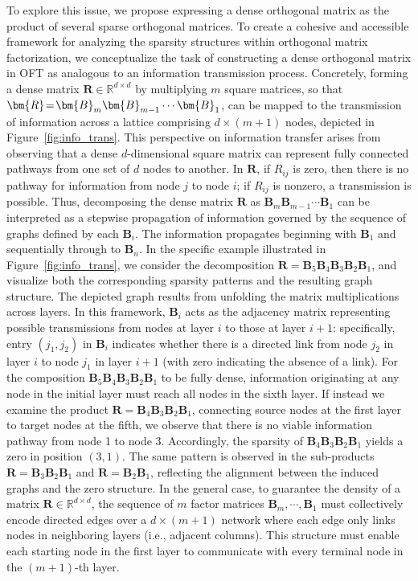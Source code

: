 To explore this issue, we propose expressing a dense orthogonal matrix as the product of several sparse orthogonal matrices. To create a cohesive and accessible framework for analyzing the sparsity structures within orthogonal matrix factorization, we conceptualize the task of constructing a dense orthogonal matrix in OFT as analogous to an information transmission process. Concretely, forming a dense matrix $\bm{R}\in\mathbb{R}^{d\times d}$ by multiplying $m$ square matrices, so that $\thickmuskip=2mu \medmuskip=2mu \bm{R}=\bm{B}_m\bm{B}_{m-1}\cdots\bm{B}_1$, can be mapped to the transmission of information across a lattice comprising $d\times (m+1)$ nodes, depicted in Figure~\ref{fig:info_trans}. This perspective on information transfer arises from observing that a dense $d$-dimensional square matrix can represent fully connected pathways from one set of $d$ nodes to another. In $\bm{R}$, if $R_{ij}$ is zero, then there is no pathway for information from node $j$ to node $i$; if $R_{ij}$ is nonzero, a transmission is possible. Thus, decomposing the dense matrix $\bm{R}$ as $\bm{B}_m\bm{B}_{m-1}\cdots\bm{B}_1$ can be interpreted as a stepwise propagation of information governed by the sequence of graphs defined by each $\bm{B}_i$. The information propagates beginning with $\bm{B}_1$ and sequentially through to $\bm{B}_n$. In the specific example illustrated in Figure~\ref{fig:info_trans}, we consider the decomposition $\bm{R}=\bm{B}_5\bm{B}_4\bm{B}_3\bm{B}_2\bm{B}_1$, and visualize both the corresponding sparsity patterns and the resulting graph structure. The depicted graph results from unfolding the matrix multiplications across layers. In this framework, $\bm{B}_i$ acts as the adjacency matrix representing possible transmissions from nodes at layer $i$ to those at layer $i+1$: specifically, entry $(j_1,j_2)$ in $\bm{B}_i$ indicates whether there is a directed link from node $j_2$ in layer $i$ to node $j_1$ in layer $i+1$ (with zero indicating the absence of a link). For the composition $\bm{B}_5\bm{B}_4\bm{B}_3\bm{B}_2\bm{B}_1$ to be fully dense, information originating at any node in the initial layer must reach all nodes in the sixth layer. If instead we examine the product $\bm{R}=\bm{B}_4\bm{B}_3\bm{B}_2\bm{B}_1$, connecting source nodes at the first layer to target nodes at the fifth, we observe that there is no viable information pathway from node 1 to node 3. Accordingly, the sparsity of $\bm{B}_4\bm{B}_3\bm{B}_2\bm{B}_1$ yields a zero in position $(3,1)$. The same pattern is observed in the sub-products $\bm{R}=\bm{B}_3\bm{B}_2\bm{B}_1$ and $\bm{R}=\bm{B}_2\bm{B}_1$, reflecting the alignment between the induced graphs and the zero structure. In the general case, to guarantee the density of a matrix $\bm{R}\in\mathbb{R}^{d\times d}$, the sequence of $m$ factor matrices $\bm{B}_m,\cdots,\bm{B}_1$ must collectively encode directed edges over a $d\times (m+1)$ network where each edge only links nodes in neighboring layers (i.e., adjacent columns). This structure must enable each starting node in the first layer to communicate with every terminal node in the $(m+1)$-th layer.

